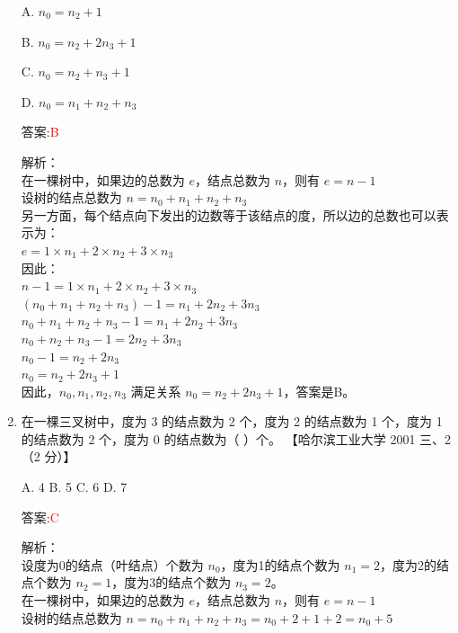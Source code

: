\documentclass[lang=cn,newtx,10pt,scheme=chinese]{../../../elegantbook}
\begin{document}
\begin{enumerate}
    A. $n_0 = n_2  + 1$ 

    B. $n_0 = n_2 + 2n_3 + 1$  

    C. $n_0 = n_2 + n_3 + 1$  

    D. $n_0 = n_1 + n_2 + n_3$  
    
    答案:\textcolor{red}{B}
    
    解析：\\
    在一棵树中，如果边的总数为 $e$，结点总数为 $n$，则有 $e = n - 1$\\
    
    设树的结点总数为 $n = n_0 + n_1 + n_2 + n_3$\\
    
    另一方面，每个结点向下发出的边数等于该结点的度，所以边的总数也可以表示为：\\
    $e = 1 \times n_1 + 2 \times n_2 + 3 \times n_3$\\
    
    因此：\\
    $n - 1 = 1 \times n_1 + 2 \times n_2 + 3 \times n_3$\\
    $(n_0 + n_1 + n_2 + n_3) - 1 = n_1 + 2n_2 + 3n_3$\\
    $n_0 + n_1 + n_2 + n_3 - 1 = n_1 + 2n_2 + 3n_3$\\
    $n_0 + n_2 + n_3 - 1 = 2n_2 + 3n_3$\\
    $n_0 - 1 = n_2 + 2n_3$\\
    $n_0 = n_2 + 2n_3 + 1$\\
    
    因此，$n_0, n_1, n_2, n_3$ 满足关系 $n_0 = n_2 + 2n_3 + 1$，答案是B。\\  

    \item 在一棵三叉树中，度为 3 的结点数为 2 个，度为 2 的结点数为 1 个，度为 1 的结点数为 2 个，度为 0 的结点数为（ ）个。  
    【哈尔滨工业大学 2001 三、2（2 分）】  

    A. 4 \quad B. 5 \quad C. 6 \quad D. 7  
    
    答案:\textcolor{red}{C}
    
    解析：\\
    设度为0的结点（叶结点）个数为 $n_0$，度为1的结点个数为 $n_1 = 2$，度为2的结点个数为 $n_2 = 1$，度为3的结点个数为 $n_3 = 2$。\\
    
    在一棵树中，如果边的总数为 $e$，结点总数为 $n$，则有 $e = n - 1$\\
    
    设树的结点总数为 $n = n_0 + n_1 + n_2 + n_3 = n_0 + 2 + 1 + 2 = n_0 + 5$\\
    

\end{enumerate}
\end{document}
